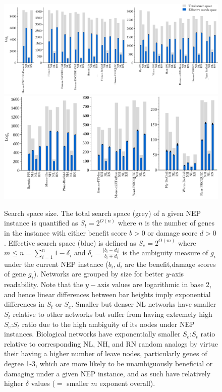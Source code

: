 \documentclass[12pt]{article}
\begin{document}
\begin{figure}[H]%
    \includegraphics[width=\textwidth]{Figure6a.png}\\
    \includegraphics[width=\textwidth]{Figure6b.png}
    \caption{
                  Search space size.
                  The total search space (grey) of a given NEP instance is quantified as $S_t = 2^{O(n)}$ where $n$ is the number of genes in the instance with either benefit score $b>0$ or damage score $d>0$.
                  Effective search space (blue) is  defined as $S_e=2^{O(m)}$ where $m\leq n=\sum\limits_{i=1}^{n}{1-\delta_i}$ and  ${\delta}_i=\frac{|b_i-d_i|}{b_i+d_i}$ is the ambiguity measure of $g_i$ under the current NEP instance ($b_i,d_i$ are the benefit,damage scores of gene $g_i$). Networks are grouped by size for better $y$-axis readability. Note that the $y-$axis values are logarithmic in base 2, and hence linear differences between bar heights imply exponential differences in $S_t$ or $S_e$. Smaller  but denser NL networks have smaller $S_t$ relative to other networks but suffer from having extremely high $S_e$:$S_t$ ratio due to the high ambiguity of its nodes under NEP instances. Biological networks have exponentially smaller $S_e$:$S_t$ ratio relative to corresponding NL, NH, and RN random analogs  by virtue their having a higher number of leave nodes, particularly genes of degree 1-3, which are more likely to be unambiguously beneficial or damaging under a given NEP instance, and as such have relatively higher $\delta$ values ($=$ smaller $m$ exponent overall).
             }\label{fig:search_space}
\end{figure}
\end{document}
